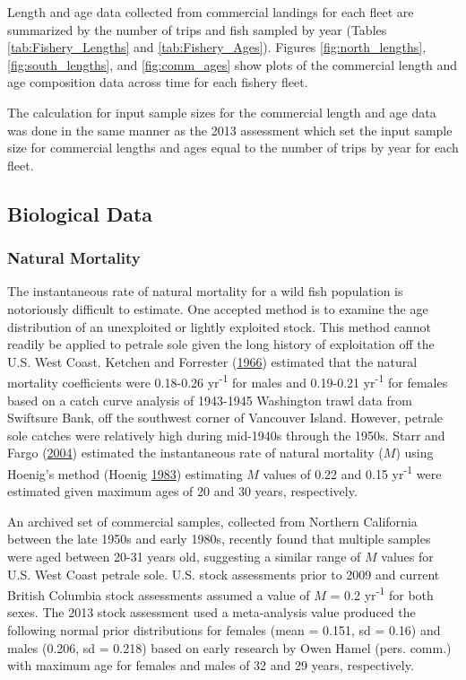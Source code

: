 \documentclass[12pt,]{article}
\begin{document}
Length and age data collected from commercial landings for each fleet
are summarized by the number of trips and fish sampled by year (Tables
\ref{tab:Fishery_Lengths} and \ref{tab:Fishery_Ages}). Figures
\ref{fig:north_lengths}, \ref{fig:south_lengths}, and
\ref{fig:comm_ages} show plots of the commercial length and age
composition data across time for each fishery fleet.

The calculation for input sample sizes for the commercial length and age
data was done in the same manner as the 2013 assessment which set the
input sample size for commercial lengths and ages equal to the number of
trips by year for each fleet.

\subsection{Biological Data}\label{biological-data}

\subsubsection{Natural Mortality}\label{natural-mortality}

The instantaneous rate of natural mortality for a wild fish population
is notoriously difficult to estimate. One accepted method is to examine
the age distribution of an unexploited or lightly exploited stock. This
method cannot readily be applied to petrale sole given the long history
of exploitation off the U.S. West Coast. Ketchen and Forrester
(\protect\hyperlink{ref-ketchen_population_1966}{1966}) estimated that
the natural mortality coefficients were 0.18-0.26 yr\textsuperscript{-1}
for males and 0.19-0.21 yr\textsuperscript{-1} for females based on a
catch curve analysis of 1943-1945 Washington trawl data from Swiftsure
Bank, off the southwest corner of Vancouver Island. However, petrale
sole catches were relatively high during mid-1940s through the 1950s.
Starr and Fargo (\protect\hyperlink{ref-starr_petrale_2004}{2004})
estimated the instantaneous rate of natural mortality (\(M\)) using
Hoenig's method (Hoenig
\protect\hyperlink{ref-hoenig_empirical_1983}{1983}) estimating \(M\)
values of 0.22 and 0.15 yr\textsuperscript{-1} were estimated given
maximum ages of 20 and 30 years, respectively.

An archived set of commercial samples, collected from Northern
California between the late 1950s and early 1980s, recently found that
multiple samples were aged between 20-31 years old, suggesting a similar
range of \(M\) values for U.S. West Coast petrale sole. U.S. stock
assessments prior to 2009 and current British Columbia stock assessments
assumed a value of \(M\) = 0.2 yr\textsuperscript{-1} for both sexes.
The 2013 stock assessment used a meta-analysis value produced the
following normal prior distributions for females (mean = 0.151, sd =
0.16) and males (0.206, sd = 0.218) based on early research by Owen
Hamel (pers. comm.) with maximum age for females and males of 32 and 29
years, respectively.
\end{document}
